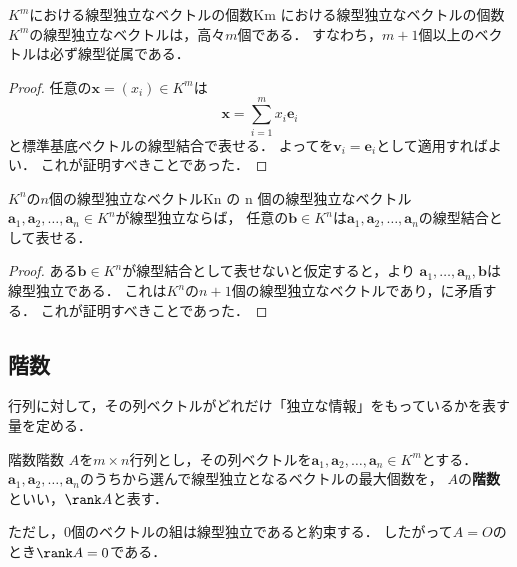 \begin{cor}{$K^m$における線型独立なベクトルの個数}{Km における線型独立なベクトルの個数}
  $K^m$の線型独立なベクトルは，高々$m$個である．
  すなわち，$m + 1$個以上のベクトルは必ず線型従属である．
\end{cor}

\begin{leftbar}
\begin{proof}
  任意の$\bm{x} = (x_i) \in K^m$は
  \[
    \bm{x} = \sum_{i=1}^{m} x_i \bm{e}_i
  \]
  と標準基底ベクトルの線型結合で表せる．
  よってを$\bm{v}_i = \bm{e}_i$として適用すればよい．
  これが証明すべきことであった．
\end{proof}
\end{leftbar}

\begin{cor}{$K^n$の$n$個の線型独立なベクトル}{Kn の n 個の線型独立なベクトル}
  $\bm{a}_1, \bm{a}_2, \dots, \bm{a}_n \in K^n$が線型独立ならば，
  任意の$\bm{b} \in K^n$は$\bm{a}_1, \bm{a}_2, \dots, \bm{a}_n$の線型結合として表せる．
\end{cor}

\begin{leftbar}
\begin{proof}
  ある$\bm{b} \in K^n$が線型結合として表せないと仮定すると，より
  $\bm{a}_1, \dots, \bm{a}_n, \bm{b}$は線型独立である．
  これは$K^n$の$n + 1$個の線型独立なベクトルであり，に矛盾する．
  これが証明すべきことであった．
\end{proof}
\end{leftbar}

\subsection{階数}

行列に対して，その列ベクトルがどれだけ「独立な情報」をもっているかを表す量を定める．

\begin{definition}{階数}{階数}
  $A$を$m \times n$行列とし，その列ベクトルを$\bm{a}_1, \bm{a}_2, \dots, \bm{a}_n \in K^m$とする．
  $\bm{a}_1, \bm{a}_2, \dots, \bm{a}_n$のうちから選んで線型独立となるベクトルの最大個数を，
  $A$の\textbf{階数}といい，$\rank A$と表す．

  ただし，$0$個のベクトルの組は線型独立であると約束する．
  したがって$A = O$のとき$\rank A = 0$である．
\end{definition}

